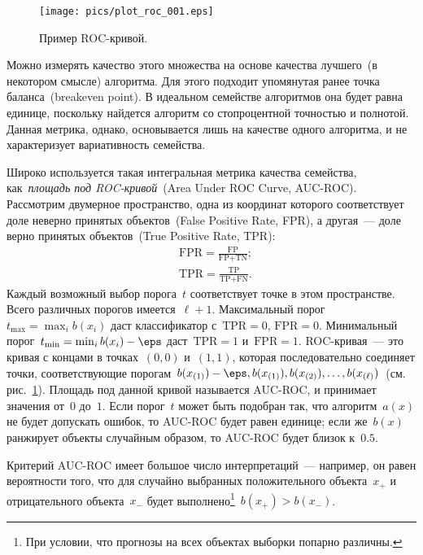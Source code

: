 \documentclass[12pt,fleqn]{article}
\begin{document}
\begin{figure}[t]
    \centering
    \texttt{[image: pics/plot\_roc\_001.eps]}
    \caption{Пример ROC-кривой.}
    \label{fig:roc}
\end{figure}

Можно измерять качество этого множества на основе качества лучшего~(в некотором смысле) алгоритма.
Для этого подходит упомянутая ранее точка баланса~(breakeven point).
В идеальном семействе алгоритмов она будет равна единице, поскольку найдется
алгоритм со стопроцентной точностью и полнотой.
Данная метрика, однако, основывается лишь на качестве одного алгоритма,
и не характеризует вариативность семейства.

Широко используется такая интегральная метрика качества семейства,
как~\emph{площадь под ROC-кривой}~(Area Under ROC Curve, AUC-ROC).
Рассмотрим двумерное пространство, одна из координат которого соответствует
доле неверно принятых объектов~(False Positive Rate, FPR),
а другая~--- доле верно принятых объектов~(True Positive Rate, TPR):
\begin{align*}
    &\text{FPR}
    =
    \frac{
        \text{FP}
    }{
        \text{FP} + \text{TN}
    };\\
    &\text{TPR}
    =
    \frac{
        \text{TP}
    }{
        \text{TP} + \text{FN}
    }.
\end{align*}
Каждый возможный выбор порога~$t$ соответствует точке в этом пространстве.
Всего различных порогов имеется~$\ell + 1$.
Максимальный порог~$t_{\max} = \max_{i} b(x_i)$ даст классификатор
с~$\text{TPR} = 0$, $\text{FPR} = 0$.
Минимальный порог~$t_{\min} = \min_{i} b(x_i) - \eps$ даст~$\text{TPR} = 1$
и~$\text{FPR} = 1$.
ROC-кривая~--- это кривая с концами в точках~$(0, 0)$ и~$(1, 1)$,
которая последовательно соединяет точки, соответствующие
порогам~$b(x_{(1)}) - \eps, b(x_{(1)}), b(x_{(2)}), \dots, b(x_{(\ell)})$~(см. рис.~\ref{fig:roc}).
Площадь под данной кривой называется AUC-ROC, и принимает значения от~$0$ до~$1$.
Если порог~$t$ может быть подобран так, что алгоритм~$a(x)$ не будет допускать ошибок,
то AUC-ROC будет равен единице;
если же~$b(x)$ ранжирует объекты случайным образом, то AUC-ROC будет близок к~$0.5$.

Критерий AUC-ROC имеет большое число интерпретаций~--- например,
он равен вероятности того, что для случайно выбранных
положительного объекта~$x_+$ и отрицательного объекта~$x_-$
будет выполнено\footnote{При условии, что прогнозы на всех объектах выборки попарно различны.}~$b(x_+) > b(x_-)$.
\end{document}
